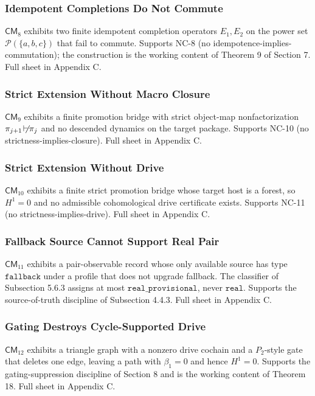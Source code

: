 \documentclass[11pt]{article}
\providecommand{\factor}{\mathrel{\!\vdash\!}}
\theoremstyle{definition}
\begin{document}
\subsubsection{Idempotent Completions Do Not Commute}

\(\mathsf{CM}_8\) exhibits two finite idempotent completion operators \(E_1,E_2\) on the power set \(\mathcal P(\{a,b,c\})\) that fail to commute. Supports NC-8 (no idempotence-implies-commutation); the construction is the working content of Theorem 9 of Section 7. Full sheet in Appendix C.

\subsubsection{Strict Extension Without Macro Closure}

\(\mathsf{CM}_9\) exhibits a finite promotion bridge with strict object-map nonfactorization \(\pi_{j+1}\not\factor\pi_j\) and no descended dynamics on the target package. Supports NC-10 (no strictness-implies-closure). Full sheet in Appendix C.

\subsubsection{Strict Extension Without Drive}

\(\mathsf{CM}_{10}\) exhibits a finite strict promotion bridge whose target host is a forest, so \(H^1=0\) and no admissible cohomological drive certificate exists. Supports NC-11 (no strictness-implies-drive). Full sheet in Appendix C.

\subsubsection{Fallback Source Cannot Support Real Pair}

\(\mathsf{CM}_{11}\) exhibits a pair-observable record whose only available source has type \(\texttt{fallback}\) under a profile that does not upgrade fallback. The classifier of Subsection 5.6.3 assigns at most \(\texttt{real\_provisional}\), never \(\texttt{real}\). Supports the source-of-truth discipline of Subsection 4.4.3. Full sheet in Appendix C.

\subsubsection{Gating Destroys Cycle-Supported Drive}

\(\mathsf{CM}_{12}\) exhibits a triangle graph with a nonzero drive cochain and a \(P_2\)-style gate that deletes one edge, leaving a path with \(\beta_1=0\) and hence \(H^1=0\). Supports the gating-suppression discipline of Section 8 and is the working content of Theorem 18. Full sheet in Appendix C.
\end{document}
